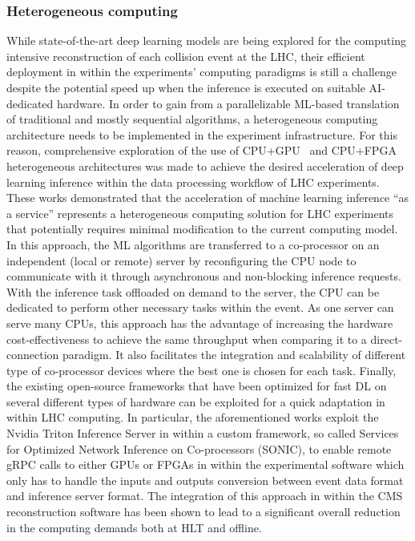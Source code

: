\subsubsection{Heterogeneous computing}

While state-of-the-art deep learning models are being explored for the computing intensive reconstruction of each collision event at the LHC, their efficient deployment in within the experiments' computing paradigms is still a challenge despite the potential speed up when the inference is executed on suitable AI-dedicated hardware. In order to gain from a parallelizable ML-based translation of traditional and mostly sequential algorithms, a heterogeneous computing architecture needs to be implemented in the experiment infrastructure. For this reason, comprehensive exploration of the use of CPU+GPU~\cite{Krupa:2020bwg} and CPU+FPGA~\cite{Duarte:2019fta,Rankin:2020usv} heterogeneous architectures  was made to achieve the desired acceleration of deep learning inference within the data processing workflow of LHC experiments. These works demonstrated that the acceleration of machine learning inference ``as a service'' represents a heterogeneous computing solution for LHC experiments that  potentially requires minimal modification to the current computing model. In this approach, the ML algorithms are transferred to a co-processor on an independent (local or remote) server by reconfiguring the CPU node to communicate with it through asynchronous and non-blocking inference requests.
With the inference task offloaded on demand to the server,  the CPU can be dedicated to perform other necessary tasks within the event.
As one server can serve many CPUs, this approach has the advantage of increasing the hardware cost-effectiveness to achieve the same throughput when comparing it to a direct-connection paradigm.
It also facilitates the integration and scalability of different type of co-processor devices where the best one is chosen for each task. Finally, the existing open-source frameworks that have been optimized for fast DL on several different types of hardware can be exploited for a quick adaptation in within LHC computing. In particular, the aforementioned works exploit the Nvidia Triton Inference Server in within a custom framework, so called Services for Optimized Network Inference on Co-processors (SONIC), to enable remote gRPC calls to either GPUs or FPGAs in within the experimental software which only has to handle the inputs and outputs conversion between event data format and inference server format. The integration of this approach in within the CMS reconstruction software has been shown to lead to a significant overall reduction in the computing demands both at HLT and offline.

